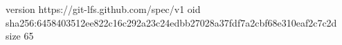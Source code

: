 version https://git-lfs.github.com/spec/v1
oid sha256:6458403512ee822c16c292a23c24edbb27028a37fdf7a2cbf68e310eaf2c7c2d
size 65
